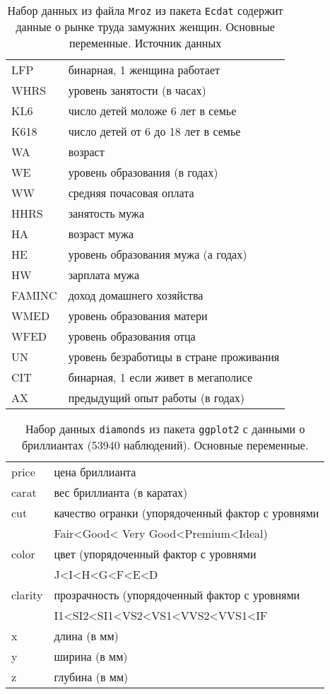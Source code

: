 \documentclass[12pt]{article}
\theoremstyle{remark}
\begin{document}
\begin{table}
	\caption{Набор данных из файла \texttt{Mroz}
	из пакета \texttt{Ecdat} содержит 
	данные о рынке труда замужних женщин.
	Основные переменные. Источник данных \cite{Mroz}} 
	\label{MrozGreen}
	\begin{tabular}{l|l}\hline
	LFP & бинарная, 1 женщина работает \\
	WHRS & уровень занятости (в часах) \\
	KL6 & число детей моложе 6 лет в семье \\
	K618  & число детей от 6 до 18 лет в семье\\
	WA & возраст \\
	WE & уровень образования (в годах) \\
	WW &  средняя почасовая оплата\\
	HHRS & занятость мужа \\
	HA & возраст мужа \\
	HE & уровень образования мужа (а годах) \\
	HW & зарплата мужа \\
	FAMINC & доход домашнего хозяйства \\
	WMED & уровень образования матери \\
	WFED & уровень образования отца \\
	UN & уровень безработицы в стране проживания \\
	CIT & бинарная, 1 если живет в мегаполисе \\
	AX & предыдущий опыт работы (в годах) \\
	\hline
	\end{tabular}
\end{table}

\begin{table}
	\caption{Набор данных \texttt{diamonds}
	из пакета \texttt{ggplot2} с данными о  бриллиантах
	(53940  наблюдений). Основные переменные.} 
	\label{diamonds}
	\begin{tabular}{l|l}\hline
	price & цена бриллианта \\
	carat & вес бриллианта (в каратах) \\
	cut & качество огранки (упорядоченный фактор с уровнями \\
	& Fair<Good< Very Good<Premium<Ideal) \\
	color  &  цвет  (упорядоченный фактор с уровнями \\
	& J<I<H<G<F<E<D\\
	clarity & прозрачность (упорядоченный фактор с уровнями \\
	& I1<SI2<SI1<VS2<VS1<VVS2<VVS1<IF\\
	x & длина (в мм) \\
	y &  ширина (в мм) \\
	z & глубина (в мм) \\
	\hline
	\end{tabular}
\end{table}
\end{document}
